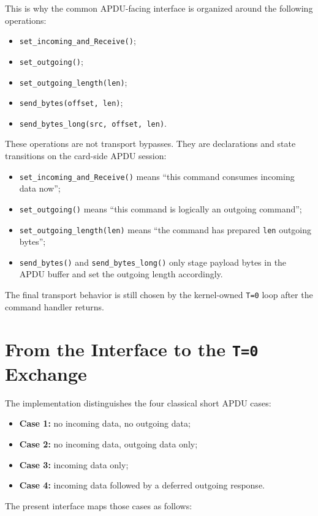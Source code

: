 This is why the common APDU-facing interface is organized around the
following operations:
\begin{itemize}
\item \texttt{set\_incoming\_and\_Receive()};
\item \texttt{set\_outgoing()};
\item \texttt{set\_outgoing\_length(len)};
\item \texttt{send\_bytes(offset, len)};
\item \texttt{send\_bytes\_long(src, offset, len)}.
\end{itemize}

These operations are not transport bypasses. They are declarations and
state transitions on the card-side APDU session:
\begin{itemize}
\item \texttt{set\_incoming\_and\_Receive()} means ``this command consumes
  incoming data now'';
\item \texttt{set\_outgoing()} means ``this command is logically an
  outgoing command'';
\item \texttt{set\_outgoing\_length(len)} means ``the command has prepared
  \texttt{len} outgoing bytes'';
\item \texttt{send\_bytes()} and \texttt{send\_bytes\_long()} only stage
  payload bytes in the APDU buffer and set the outgoing length
  accordingly.
\end{itemize}

The final transport behavior is still chosen by the kernel-owned
\texttt{T=0} loop after the command handler returns.

\section{From the Interface to the \texttt{T=0} Exchange}

The implementation distinguishes the four classical short APDU cases:
\begin{itemize}
\item \textbf{Case 1:} no incoming data, no outgoing data;
\item \textbf{Case 2:} no incoming data, outgoing data only;
\item \textbf{Case 3:} incoming data only;
\item \textbf{Case 4:} incoming data followed by a deferred outgoing
  response.
\end{itemize}

The present interface maps those cases as follows:

